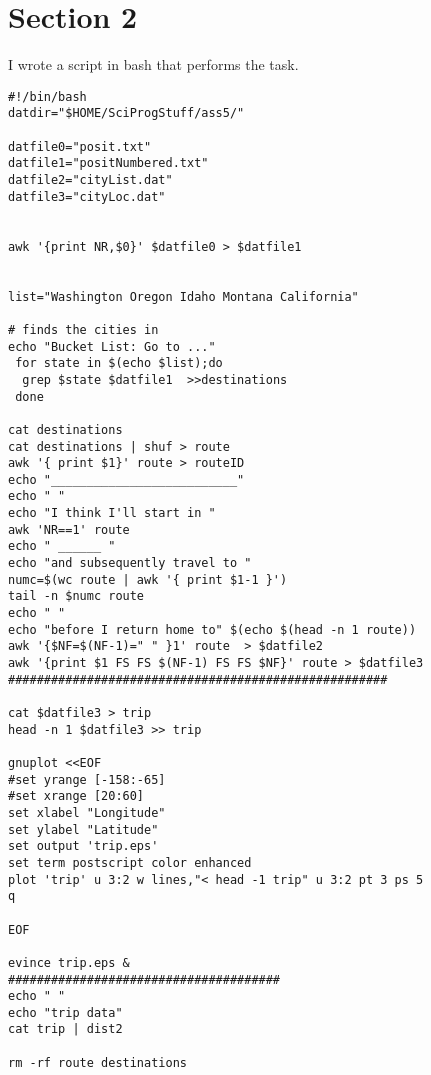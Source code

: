 \documentclass{article}
\begin{document}
\section{Section 2}
I wrote a script in bash that performs the task.
\begin{verbatim}
#!/bin/bash
datdir="$HOME/SciProgStuff/ass5/"

datfile0="posit.txt"
datfile1="positNumbered.txt"
datfile2="cityList.dat"
datfile3="cityLoc.dat"


awk '{print NR,$0}' $datfile0 > $datfile1


list="Washington Oregon Idaho Montana California"

# finds the cities in 
echo "Bucket List: Go to ..."
 for state in $(echo $list);do
  grep $state $datfile1  >>destinations
 done

cat destinations 
cat destinations | shuf > route
awk '{ print $1}' route > routeID
echo "__________________________"
echo " "
echo "I think I'll start in "
awk 'NR==1' route
echo " ______ "
echo "and subsequently travel to "
numc=$(wc route | awk '{ print $1-1 }')
tail -n $numc route
echo " "
echo "before I return home to" $(echo $(head -n 1 route))
awk '{$NF=$(NF-1)=" " }1' route  > $datfile2
awk '{print $1 FS FS $(NF-1) FS FS $NF}' route > $datfile3
#####################################################

cat $datfile3 > trip
head -n 1 $datfile3 >> trip

gnuplot <<EOF
#set yrange [-158:-65]
#set xrange [20:60]
set xlabel "Longitude"
set ylabel "Latitude"
set output 'trip.eps'
set term postscript color enhanced
plot 'trip' u 3:2 w lines,"< head -1 trip" u 3:2 pt 3 ps 5
q

EOF

evince trip.eps &
######################################
echo " "
echo "trip data"
cat trip | dist2

rm -rf route destinations 


\end{verbatim}
\end{document}
